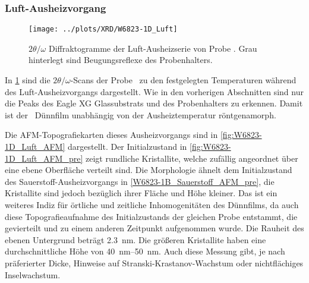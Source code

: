 \subsubsection{Luft-Aus\-heiz\-vor\-gang}\label{subsubsec:W6823-1D_Luft}
\begin{figure}
    \centering
    \texttt{[image: ../plots/XRD/W6823-1D\_Luft]}
    \caption{$2\theta/\omega$ Diffraktogramme der Luft-Ausheizserie von Probe \samplethree.
    Grau hinterlegt sind Beugungsreflexe des Probenhalters.}
    \label{fig:W6823-1D_Luft_XRD}
\end{figure}
In \cref{fig:W6823-1D_Luft_XRD} sind die $2\theta/\omega$-Scans der Probe \samplethree\ zu den festgelegten Temperaturen
während des Luft-Aus\-heiz\-vor\-gangs dargestellt.
Wie in den vorherigen Abschnitten sind nur die Peaks des Eagle XG Glassubstrats und des Probenhalters zu erkennen.
Damit ist der \heo\ Dünnfilm unabhängig von der Ausheiztemperatur röntgenamorph.

Die AFM-Topografiekarten dieses Aus\-heiz\-vor\-gangs sind in \cref{fig:W6823-1D_Luft_AFM} dargestellt.
Der Initialzustand in \cref{fig:W6823-1D_Luft_AFM_pre} zeigt rundliche Kristallite, welche zufällig angeordnet über eine
ebene Oberfläche verteilt sind.
Die Morphologie ähnelt dem Initialzustand des Sauerstoff-Aus\-heiz\-vor\-gangs in \cref{W6823-1B_Sauerstoff_AFM_pre},
die Kristallite sind jedoch bezüglich ihrer Fläche und Höhe kleiner.
Das ist ein weiteres Indiz für örtliche und zeitliche Inhomogenitäten des Dünnfilms, da auch diese
Topografieaufnahme des Initialzustands der gleichen Probe entstammt, die gevierteilt und zu einem
anderen Zeitpunkt aufgenommen wurde.
Die Rauheit des ebenen Untergrund beträgt \qty{2.3}{\nano\meter}.
Die größeren Kristallite haben eine durchschnittliche Höhe von \qtyrange{40}{50}{\nano\meter}.
Auch diese Messung gibt, je nach präferierter Dicke, Hinweise auf Stranski-Krastanov-Wachstum oder
nichtflächiges Inselwachstum.

